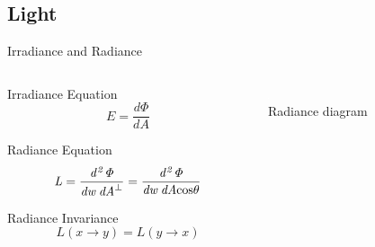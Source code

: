 \documentclass[10pt,compress,professionalfont]{beamer}
\begin{document}
\subsection{Light}
\begin{frame}{Irradiance and Radiance}

    \begin{columns}
        \begin{column}{0.5\textwidth}
                \begin{block}{Irradiance Equation}
                    \[
                    E = \frac{d\Phi}{dA}
                    \]
                \end{block}
            \begin{block}{Radiance Equation}
                \[
                \mathit{L} = \frac{\mathit{d^{2}\Phi}}{\mathit{dw\:dA}^\perp} = \frac{\mathit{d^{2}\Phi}}{\mathit{dw\:dA}\textup{cos}\theta}
                \]
            \end{block}
            \begin{block}{Radiance Invariance}
                \[
                    L(x \to y) = L(y \to x)
                \]
            \end{block}
        \end{column}
        \begin{column}{0.5\textwidth}
            \vspace{-5mm}
            {\centering
            \includegraphics[width=\textwidth]{../img/diag/radiance.pdf}\\
            \scriptsize Radiance diagram\\
            }
        \end{column}
    \end{columns}



\end{frame}
\end{document}
